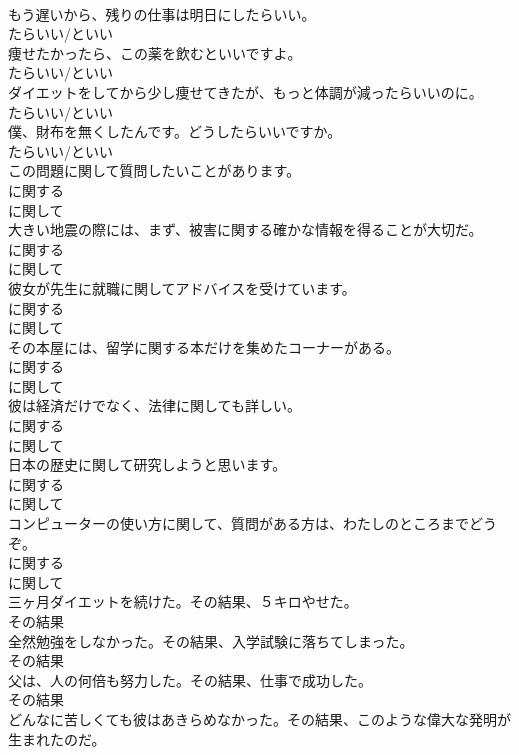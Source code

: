 \documentclass[8pt]{extreport}
\begin{document}
\begin{CJK}{UTF8}{min}
\\	もう遅いから、残りの仕事は明日にしたらいい。	
\\	たらいい/といい	
\\	痩せたかったら、この薬を飲むといいですよ。	
\\	たらいい/といい	
\\	ダイエットをしてから少し痩せてきたが、もっと体調が減ったらいいのに。	
\\	たらいい/といい	
\\	僕、財布を無くしたんです。どうしたらいいですか。	
\\	たらいい/といい	
\\	この問題に関して質問したいことがあります。	
\\	に関する 
\\	に関して	
\\	大きい地震の際には、まず、被害に関する確かな情報を得ることが大切だ。	
\\	に関する 
\\	に関して	
\\	彼女が先生に就職に関してアドバイスを受けています。	
\\	に関する 
\\	に関して	
\\	その本屋には、留学に関する本だけを集めたコーナーがある。	
\\	に関する 
\\	に関して	
\\	彼は経済だけでなく、法律に関しても詳しい。	
\\	に関する 
\\	に関して	
\\	日本の歴史に関して研究しようと思います。	
\\	に関する 
\\	に関して	
\\	コンピューターの使い方に関して、質問がある方は、わたしのところまでどうぞ。	
\\	に関する 
\\	に関して	
\\	三ヶ月ダイエットを続けた。その結果、５キロやせた。	
\\	その結果	
\\	全然勉強をしなかった。その結果、入学試験に落ちてしまった。	
\\	その結果	
\\	父は、人の何倍も努力した。その結果、仕事で成功した。	
\\	その結果	
\\	どんなに苦しくても彼はあきらめなかった。その結果、このような偉大な発明が生まれたのだ。	

\end{CJK}
\end{document}
